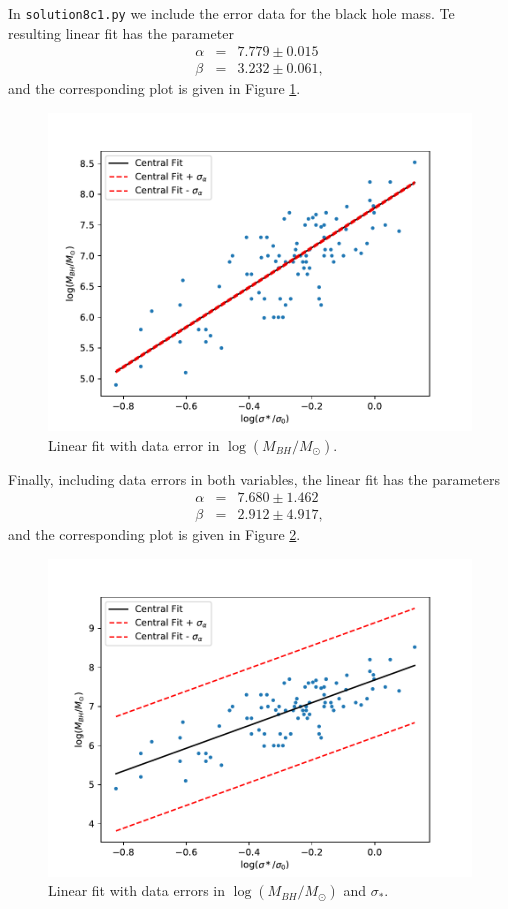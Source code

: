 \documentclass[11pt]{article}
\begin{document}
In {\tt solution8c1.py} we include the error data for the black hole mass. Te resulting linear fit has the parameter
\begin{eqnarray}
\alpha &=& 7.779 \pm 0.015 \\
\beta &=&  3.232 \pm 0.061,
\end{eqnarray}
and the corresponding plot is given in Figure \ref{fig:Merrorfit}.
\begin{figure}[h]
\centering
\includegraphics[scale=0.5]{M-sigma_with_errorM.pdf}
\caption{Linear fit with data error in $\log (M_{BH}/M_{\odot })$.}
\label{fig:Merrorfit}
\end{figure}

Finally, including data errors in both variables, the linear fit has the parameters
\begin{eqnarray}
\alpha &=& 7.680 \pm 1.462 \\
\beta &=&  2.912 \pm 4.917,
\end{eqnarray}
and the corresponding plot is given in Figure \ref{fig:Allerrorsfit}.
\begin{figure}[h]
\centering
\includegraphics[scale=0.5]{M-sigma_with_errors.pdf}
\caption{Linear fit with data errors in $\log (M_{BH}/M_{\odot })$ and $\sigma_{*}$.}
\label{fig:Allerrorsfit}
\end{figure}
\end{document}
